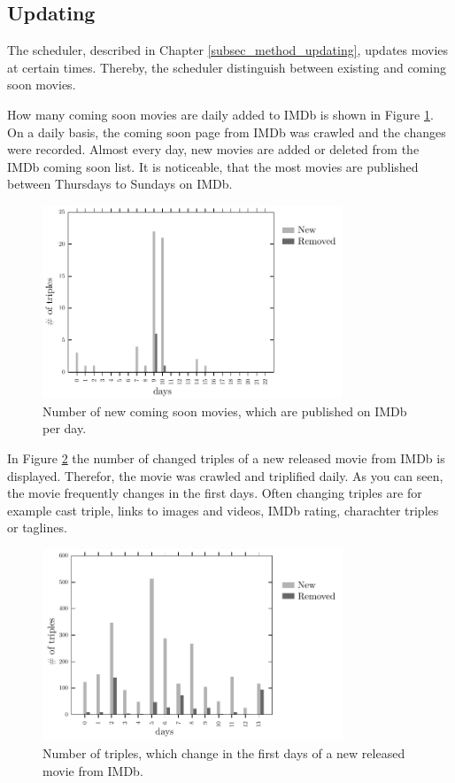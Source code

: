\subsection{Updating}
\label{subsec_evaluation_updating}

The scheduler, described in Chapter \ref{subsec_method_updating}, updates movies at certain times.
Thereby, the scheduler distinguish between existing and coming soon movies.

How many coming soon movies are daily added to IMDb is shown in Figure \ref{fig_coming_soon_movie}.
On a daily basis, the coming soon page from IMDb was crawled and the changes were recorded.
Almost every day, new movies are added or deleted from the IMDb coming soon list.
It is noticeable, that the most movies are published between Thursdays to Sundays on IMDb.

\begin{figure}[h!]
  \begin{center}
  \includegraphics[width=0.8\textwidth]{images/updating_1.pdf}
  \end{center}
  \caption{Number of new coming soon movies, which are published on IMDb per day.}
  \label{fig_coming_soon_movie}
\end{figure}

In Figure \ref{fig_new_movie} the number of changed triples of a new released movie from IMDb is displayed.
Therefor, the movie was crawled and triplified daily.
As you can seen, the movie frequently changes in the first days.
Often changing triples are for example cast triple, links to images and videos, IMDb rating, charachter triples or taglines.

\begin{figure}[h!]
  \begin{center}
  \includegraphics[width=0.8\textwidth]{images/updating_2.pdf}
  \end{center}
  \caption{Number of triples, which change in the first days of a new released movie from IMDb.}
  \label{fig_new_movie}
\end{figure}